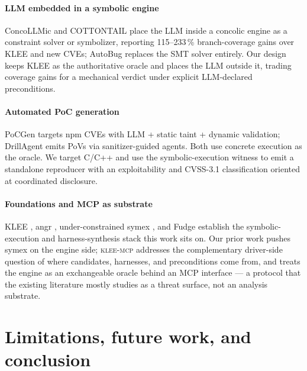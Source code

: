 \documentclass[3p,times,procedia]{elsarticle}
\begin{document}
\paragraph{LLM embedded in a symbolic engine} ConcoLLMic \cite{concollmic} and COTTONTAIL \cite{cottontail} place the LLM inside a concolic engine as a constraint solver or symbolizer, reporting 115--233\,\% branch-coverage gains over KLEE and new CVEs; AutoBug \cite{autobug} replaces the SMT solver entirely. Our design keeps KLEE as the authoritative oracle and places the LLM outside it, trading coverage gains for a mechanical verdict under explicit LLM-declared preconditions.

\paragraph{Automated PoC generation} PoCGen \cite{pocgen} targets npm CVEs with LLM + static taint + dynamic validation; DrillAgent \cite{drillagent} emits PoVs via sanitizer-guided agents. Both use concrete execution as the oracle. We target C/C++ and use the symbolic-execution witness to emit a standalone reproducer with an exploitability and CVSS-3.1 classification oriented at coordinated disclosure.

\paragraph{Foundations and MCP as substrate} KLEE \cite{klee}, angr \cite{angr}, under-constrained symex \cite{ucklee}, and Fudge \cite{fudge} establish the symbolic-execution and harness-synthesis stack this work sits on. Our prior work \cite{scherb-divconq,scherb-cps} pushes symex on the engine side; \textsc{klee-mcp} addresses the complementary driver-side question of where candidates, harnesses, and preconditions come from, and treats the engine as an exchangeable oracle behind an MCP \cite{mcp} interface --- a protocol that the existing literature mostly studies as a threat surface, not an analysis substrate.

\section{Limitations, future work, and conclusion}
\label{sec:limits}
\end{document}
